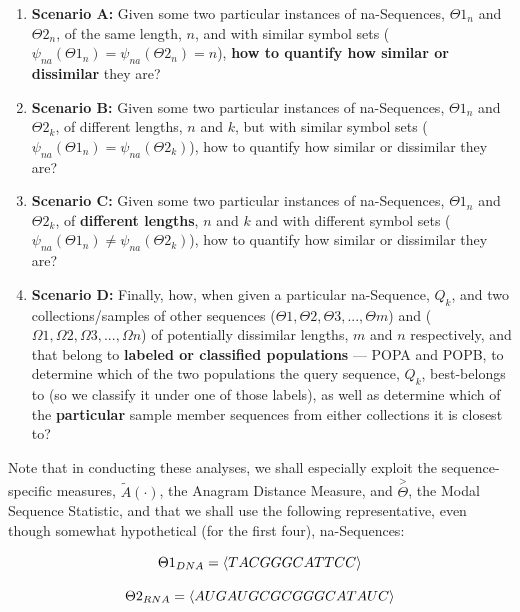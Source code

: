 \documentclass[a4paper, 18pt]{book} %
\begin{document}
\begin{enumerate}
\item \textbf{Scenario A:} Given some two particular instances of na-Sequences, $\Theta1_n$ and $\Theta2_n$, of the same length, $n$, and with similar symbol sets ($\psi_{na}(\Theta1_n) = \psi_{na}(\Theta2_n) = n$), \textbf{how to quantify how similar or dissimilar} they are?
\item \textbf{Scenario B:} Given some two particular instances of na-Sequences, $\Theta1_n$ and $\Theta2_k$, of different lengths, $n$ and $k$, but with similar symbol sets ($\psi_{na}(\Theta1_n) = \psi_{na}(\Theta2_k)$), how to quantify how similar or dissimilar they are?
\item \textbf{Scenario C:} Given some two particular instances of na-Sequences, $\Theta1_n$ and $\Theta2_k$, of \textbf{different lengths}, $n$ and $k$ and with different symbol sets ($\psi_{na}(\Theta1_n) \neq \psi_{na}(\Theta2_k)$), how to quantify how similar or dissimilar they are?
\item \textbf{Scenario D:} Finally, how, when given a particular na-Sequence, $Q_k$, and two collections/samples of other sequences ($\Theta1, \Theta2, \Theta3,..., \Theta m$) and ($\Omega1, \Omega2, \Omega3,..., \Omega n$) of potentially dissimilar lengths, $m$ and $n$ respectively, and that belong to \textbf{labeled or classified populations} --- POPA and POPB, to determine which of the two populations the query sequence, $Q_k$, best-belongs to (so we classify it under one of those labels), as well as determine which of the \textbf{particular} sample member sequences from either collections it is closest to?
\end{enumerate}

Note that in conducting these analyses, we shall especially exploit the sequence-specific measures, $\tilde{A}(\cdot)$, the Anagram Distance Measure\cite{adtpaper}\cite{transformatics}, and $\overset{>}{\Theta}$, the Modal Sequence Statistic\cite{transformatics}, and that we shall use the following representative, even though somewhat hypothetical (for the first four), na-Sequences:

\begin{equation}
{\Theta1}_{DNA} = \langle TAC GGG CAT TCC \rangle\\
\end{equation}

\begin{equation}
{\Theta2}_{RNA} = \langle AUG AUG CGC GGG CAT AUC \rangle\\
\end{equation}
\end{document}

